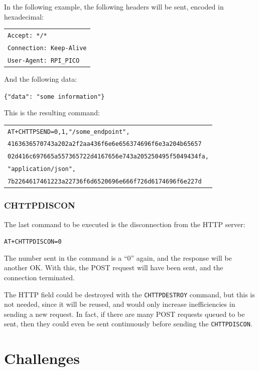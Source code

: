 In the following example, the following headers will be sent, encoded in hexadecimal:

\begin{tabular}{l}
    \texttt{Accept: */*} \\
    \texttt{Connection: Keep-Alive} \\
    \texttt{User-Agent: RPI\_PICO}
\end{tabular}

And the following data:

\begin{center}
	\texttt{\{"data": "some information"\}}
\end{center}

This is the resulting command:

\begin{tabular}{l}
    \texttt{AT+CHTTPSEND=0,1,"/some\_endpoint",} \\
	\texttt{4163636570743a202a2f2aa436f6e6e656374696f6e3a204b65657} \\
	\texttt{02d416c697665a557365722d4167656e743a205250495f5049434fa,} \\
	\texttt{"application/json",} \\
	\texttt{7b2264617461223a22736f6d6520696e666f726d6174696f6e227d}
\end{tabular}

\subsubsection*{CHTTPDISCON}
The last command to be executed is the disconnection from the HTTP server:
\begin{center}
	\texttt{AT+CHTTPDISCON=0}
\end{center}

The number sent in the command is a ``0'' again, and the response will be another OK. With this, 
the POST request will have been sent, and the connection terminated.

The HTTP field could be destroyed with the \texttt{CHTTPDESTROY} command, but this is not needed, 
since it will be reused, and would only increase inefficiencies in sending a new request. In fact, 
if there are many POST requests queued to be sent, then they could even be sent continuously before 
sending the \texttt{CHTTPDISCON}.



%
%

\section{Challenges}

